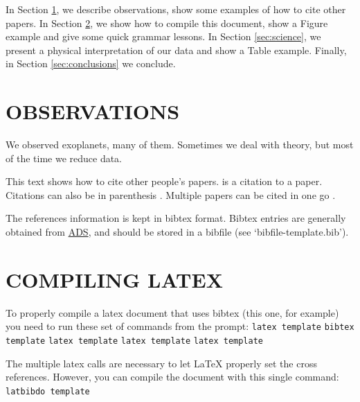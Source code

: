 In Section \ref{sec:observations}, we describe observations, show some
examples of how to cite other papers.  In Section
\ref{sec:compile}, we show how to compile this document, show a Figure
example and give some quick grammar lessons.  In Section
\ref{sec:science}, we present a physical interpretation of our data
and show a Table example.  Finally, in Section \ref{sec:conclusions}
we conclude.

\section{OBSERVATIONS}
\label{sec:observations}

We observed exoplanets, many of them.  Sometimes we deal with theory,
but most of the time we reduce data.

This text shows how to cite other people's papers.
\citet{HarringtonEtal2006sciuandbphas} is a citation to a paper.
Citations can also be in parenthesis
\citep[e.g.,][]{HarringtonEtal2007natHD149026b}.  Multiple papers can
be cited in one go \citep{StevensonEtal2010natGJ436b,
  StevensonEtal2012apjHD149026b, StevensonEtal2012apjGJ436c,
  BlecicEtal2013apjWASP14b, BlecicEtal2014apjWASP43b,
  CubillosEtal2013apjWASP8b, CubillosEtal2014apjTrES1,
  CampoEtal2011apjWASP12b, NymeyerEtal2011apjWASP18b}.

The references information is kept in bibtex format.  Bibtex entries
are generally obtained from
\href{http://adsabs.harvard.edu/abstract_service.html}{ADS}, and
should be stored in a bibfile (see `bibfile-template.bib').


\section{COMPILING LATEX}
\label{sec:compile}

To properly compile a latex document that uses bibtex (this one, for
example) you need to run these set of commands from the prompt:
\newline
\indent \texttt{latex template} \newline
\indent \texttt{bibtex template} \newline
\indent \texttt{latex template} \newline
\indent \texttt{latex template} \newline
\indent \texttt{latex template} \newline

The multiple latex calls are necessary to let LaTeX properly set the
cross references.  However, you can compile the document with this single command: \newline
\indent \texttt{latbibdo template} \newline

